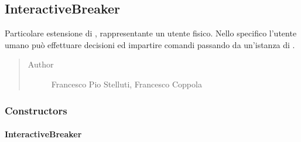 \documentclass[letterpaper,10pt,italian,openany,oneside]{sphinxmanual}
\begin{document}
\subsection{InteractiveBreaker}
\label{\detokenize{source/it/unicam/cs/pa/mastermind/players/InteractiveBreaker:interactivebreaker}}\label{\detokenize{source/it/unicam/cs/pa/mastermind/players/InteractiveBreaker::doc}}

\begin{fulllineitems}
\label{\detokenize{source/it/unicam/cs/pa/mastermind/players/InteractiveBreaker:it.unicam.cs.pa.mastermind.players.InteractiveBreaker}}
Particolare estensione di , rappresentante un utente fisico. Nello specifico l’utente umano può effettuare decisioni ed impartire comandi passando da un’istanza di .
\begin{quote}\begin{description}
\item[{Author}] \leavevmode
Francesco Pio Stelluti, Francesco Coppola

\end{description}\end{quote}

\end{fulllineitems}



\subsubsection{Constructors}
\label{\detokenize{source/it/unicam/cs/pa/mastermind/players/InteractiveBreaker:constructors}}

\paragraph{InteractiveBreaker}
\label{\detokenize{source/it/unicam/cs/pa/mastermind/players/InteractiveBreaker:id1}}

\begin{fulllineitems}
\label{\detokenize{source/it/unicam/cs/pa/mastermind/players/InteractiveBreaker:it.unicam.cs.pa.mastermind.players.InteractiveBreaker.InteractiveBreaker(GameView)}}
\end{fulllineitems}
\end{document}

